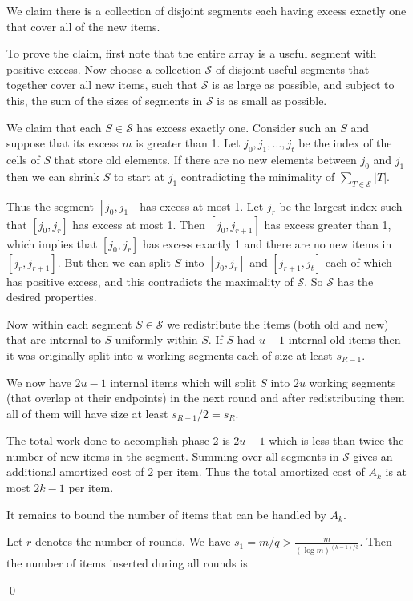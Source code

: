 \documentclass[unicode,review]{siamart1116}
\newenvironment{proofof}[1]{\noindent{\textbf { Proof of #1:}}} {{\qed}}
\numberwithin{theorem}{section}
\begin{document}
\begin{proofof}{\Cref{thm:ub}}
We claim there is a collection of disjoint segments each having excess exactly one that cover all of the new items.

To prove the claim,  first note that the entire array is a useful segment with positive excess.  
Now choose a collection $\mathcal{S}$ of disjoint useful segments that together cover all new items, such that $\mathcal{S}$
is as large as possible, and subject to this, the sum of the sizes of segments in $\mathcal{S}$ is as small as possible.

We claim that each $S \in \mathcal{S}$ has excess exactly one.   Consider such an $S$ and suppose that
its excess $m$ is greater than 1.  Let $j_0,j_1,\ldots,j_t$ be the index of the cells of $S$
that store old elements.  If there are no new elements between $j_0$ and $j_1$ then we can shrink $S$
to start at $j_1$ contradicting the minimality of $\sum_{T \in \mathcal{S}} |T|$.

Thus the segment $[j_0,j_1]$ has excess at most 1.  Let $j_r$ be the largest index such that $[j_0,j_r]$
has excess at most 1.   Then $[j_0,j_{r+1}]$ has excess greater than 1, which
implies that $[j_0,j_r]$ has excess exactly 1 and there are no new items in
$[j_r,j_{r+1}]$.   But then we can split
$S$ into $[j_0,j_r]$ and $[j_{r+1},j_t]$ each of which has positive excess, and this
contradicts the maximality of $\mathcal{S}$.  So $\mathcal{S}$ has the desired properties.


Now within each segment $S \in \mathcal{S}$ we redistribute the items (both old and new) that are internal to $S$ uniformly
within $S$.  If $S$ had $u-1$ internal old items then it was originally split into $u$
working segments each of size at least $s_{R-1}$.  

We now have $2u-1$ internal items which will split $S$ into $2u$ working segments (that overlap at their endpoints)
in the next round and after redistributing them all of them will have size at least $s_{R-1}/2=s_R$.



The total work done to accomplish phase 2 is $2u-1$ which is less than twice the number of new items in the segment.
Summing over all segments in $\mathcal{S}$ gives an additional amortized cost of 2 per item.
Thus the total amortized cost of $A_k$ is at most $2k-1$ per item.



It remains to bound the number of items that can be handled by $A_k$.



Let $r$ denotes the number of rounds. We have  $s_1 =m/q  
> \frac{m}{(\log m)^{(k-1)/3} }$. Then the number of items inserted during all rounds is


\end{proofof}
\end{document}
